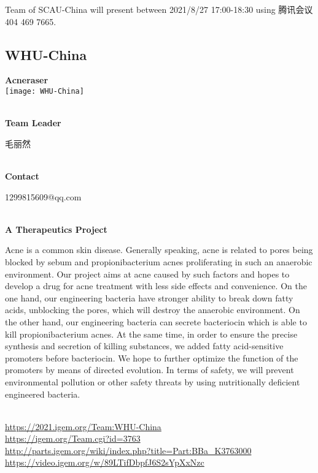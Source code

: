 \vfill{}









Team of SCAU-China will present between   2021/8/27 17:00-18:30      using 腾讯会议 404 469 7665.
\newpage


\subsection{\textcolor{Blu}{ WHU-China } }
\vspace{5mm}
\begin{center}
\large{
  \textbf{ Acneraser }\\

  \texttt{[image: WHU-China]}
}
\end{center}
\textbf{\\Team Leader}

  毛丽然


\textbf{\\Contact}

  1299815609@qq.com


\textbf{\\A Therapeutics Project\\}\begin{spacing}{1.5}

Acne is a common skin disease. Generally speaking, acne is related to pores being blocked by sebum and propionibacterium acnes proliferating in such an anaerobic environment. Our project aims at acne caused by such factors and hopes to develop a drug for acne treatment with less side effects and convenience. On the one hand, our engineering bacteria have stronger ability to break down fatty acids, unblocking the pores, which will destroy the anaerobic environment. On the other hand, our engineering bacteria can secrete bacteriocin which is able to kill propionibacterium acnes. At the same time, in order to ensure the precise synthesis and secretion of killing substances, we added fatty acid-sensitive promoters before bacteriocin. We hope to further optimize the function of the promoters by means of directed evolution. In terms of safety, we will prevent environmental pollution or other safety threats by using nutritionally deficient engineered bacteria.\end{spacing}
\\

\url{https://2021.igem.org/Team:WHU-China }\\
\url{https://igem.org/Team.cgi?id=3763 }\\
\url{http://parts.igem.org/wiki/index.php?title=Part:BBa_K3763000 }\\
\url{https://video.igem.org/w/89LTifDbpfJ6S2sYpXxNzc }\\


